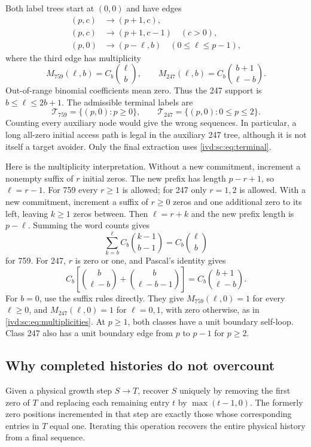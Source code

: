 \documentclass[11pt,letterpaper]{article}
\theoremstyle{remark}\newtheorem{remark}[theorem]{Remark}
\numberwithin{equation}{section}
\begin{document}
Both label trees start at $(0,0)$ and have edges
\begin{align}
 (p,c)&\longrightarrow(p+1,c),\\
 (p,c)&\longrightarrow(p+1,c-1)\quad(c>0),\\
 (p,0)&\longrightarrow(p-\ell,b)\quad(0\le\ell\le p-1),
 \label{ivd:sc:eq:edges}
\end{align}
where the third edge has multiplicity
\begin{equation}\label{ivd:sc:eq:multiplicities}
 M_{759}(\ell,b)=C_b\binom\ell b,\qquad
 M_{247}(\ell,b)=C_b\binom{b+1}{\ell-b}.
\end{equation}
Out-of-range binomial coefficients mean zero. Thus the 247 support is
$b\le\ell\le2b+1$. The admissible terminal labels are
\begin{equation}\label{ivd:sc:eq:terminal}
 \mathcal T_{759}=\{(p,0):p\ge0\},\qquad
 \mathcal T_{247}=\{(p,0):0\le p\le2\}.
\end{equation}
Counting every auxiliary node would give the wrong sequences. In
particular, a long all-zero initial access path is legal in the auxiliary
247 tree, although it is not itself a target avoider. Only the final
extraction uses \eqref{ivd:sc:eq:terminal}.

Here is the multiplicity interpretation. Without a new commitment,
increment a nonempty suffix of $r$ initial zeros. The new prefix has
length $p-r+1$, so $\ell=r-1$. For 759 every $r\ge1$ is allowed; for
247 only $r=1,2$ is allowed. With a new commitment, increment a suffix
of $r\ge0$ zeros and one additional zero to its left, leaving $k\ge1$
zeros between. Then $\ell=r+k$ and the new prefix length is $p-\ell$.
Summing the word counts gives
\[
 \sum_{k=b}^{\ell}C_b\binom{k-1}{b-1}=C_b\binom\ell b
\]
for 759. For 247, $r$ is zero or one, and Pascal's identity gives
\[
 C_b\left[\binom b{\ell-b}+\binom b{\ell-b-1}\right]
 =C_b\binom{b+1}{\ell-b}.
\]
For $b=0$, use the suffix rules directly. They give
$M_{759}(\ell,0)=1$ for every $\ell\ge0$, and
$M_{247}(\ell,0)=1$ for $\ell=0,1$, with zero otherwise,
as in \eqref{ivd:sc:eq:multiplicities}.
At $p\ge1$, both classes have a unit boundary self-loop. Class 247
also has a unit boundary edge from $p$ to $p-1$ for $p\ge2$.

\subsection{Why completed histories do not overcount}
Given a physical growth step $S\to T$, recover $S$ uniquely by removing
the first zero of $T$ and replacing each remaining entry $t$ by
$\max(t-1,0)$. The formerly zero positions incremented in that step are
exactly those whose corresponding entries in $T$ equal one. Iterating
this operation recovers the entire physical history from a final sequence.
\end{document}
